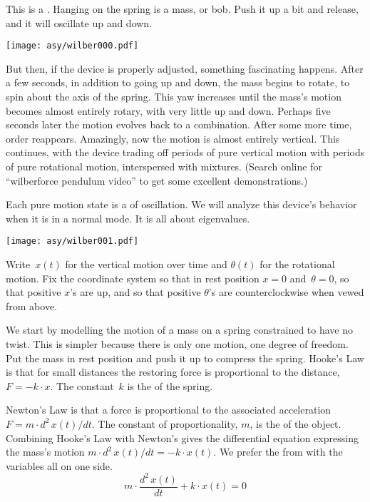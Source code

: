 
% 

This is a .
Hanging on the spring is a mass, or bob.
Push it up a bit and release, and it will oscillate up and down.
\begin{center}
  \texttt{[image: asy/wilber000.pdf]}
\end{center}
But then, if the device is properly adjusted, something fascinating happens.
After a few seconds, in addition to going up
and down, the mass begins to rotate,
to spin about the axis of the spring.
This yaw increases until the mass's motion  
becomes almost entirely rotary, with very little up and down.
Perhaps five seconds later the motion evolves back to a combination.
After some more time, order reappears.
Amazingly, now
the motion is almost entirely vertical.
This continues, with the device trading off
periods of pure vertical motion with periods of pure rotational motion,
interspersed with mixtures. 
(Search online for ``wilberforce pendulum video'' to get 
some excellent demonstrations.) 

Each pure motion state is a  of oscillation.
We will analyze this device's behavior when it is in a normal mode. 
It is all about eigenvalues.

\begin{center}
  \texttt{[image: asy/wilber001.pdf]}
\end{center}

Write~$x(t)$ for the vertical motion over time and 
$\theta(t)$ for the rotational motion.
Fix the coordinate system so that in rest position $x=0$ and~$\theta=0$, 
so that positive $x$'s are up, and so that positive $\theta$'s
are counterclockwise when vewed from above.

We start by modelling the motion of a mass on a 
spring constrained to have no twist.
This is simpler because there is only one motion, one degree of freedom.
Put the mass in rest position and 
push it up to compress the spring.
Hooke's Law is that for small distances
the restoring force is 
proportional to the distance, $F=-k\cdot x$.
The constant~$k$ is the
 of the spring.

Newton's Law is that a force is proportional to the 
associated acceleration $F=m\cdot d^2\,x(t)/dt$.
The constant of proportionality, $m$, is the 
of the object.
Combining Hooke's Law with Newton's 
gives the differential equation expressing the 
mass's motion $m\cdot d^2\,x(t)/dt=-k\cdot x(t)$.
We prefer the from with the variables all on one side.
\begin{equation*}
  m\cdot \frac{d^2\,x(t)}{dt}+k\cdot x(t)=0
  \tag{$*$}
\end{equation*}

